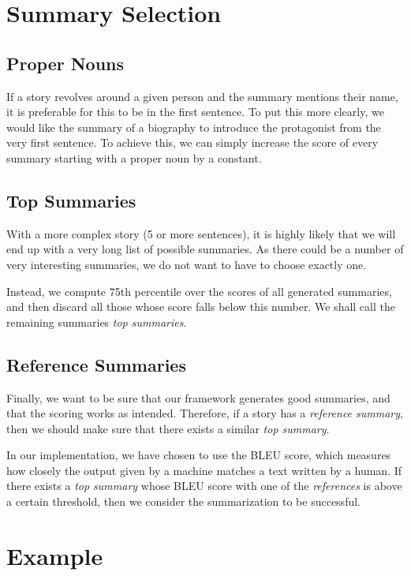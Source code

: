 \section{Summary Selection}
\label{sec:summary_selection}

\subsection{Proper Nouns}

If a story revolves around a given person and the summary mentions their name, it is preferable for this to be in the first sentence. To put this more clearly, we would like the summary of a biography to introduce the protagonist from the very first sentence. To achieve this, we can simply increase the score of every summary starting with a proper noun by a constant.

\subsection{Top Summaries}

With a more complex story (5 or more sentences), it is highly likely that we will end up with a very long list of possible summaries. As there could be a number of very interesting summaries, we do not want to have to choose exactly one.

Instead, we compute 75th percentile over the scores of all generated summaries, and then discard all those whose score falls below this number. We shall call the remaining summaries \textit{top summaries}.

\subsection{Reference Summaries}

Finally, we want to be sure that our framework generates good summaries, and that the scoring works as intended. Therefore, if a story has a \textit{reference summary}, then we should make sure that there exists a similar \textit{top summary}.

In our implementation, we have chosen to use the BLEU score, which measures how closely the output given by a machine matches a text written by a human. If there exists a \textit{top summary} whose BLEU score with one of the \textit{references} is above a certain threshold, then we consider the summarization to be successful.

\section{Example}
\label{sec:postprocess_example}

